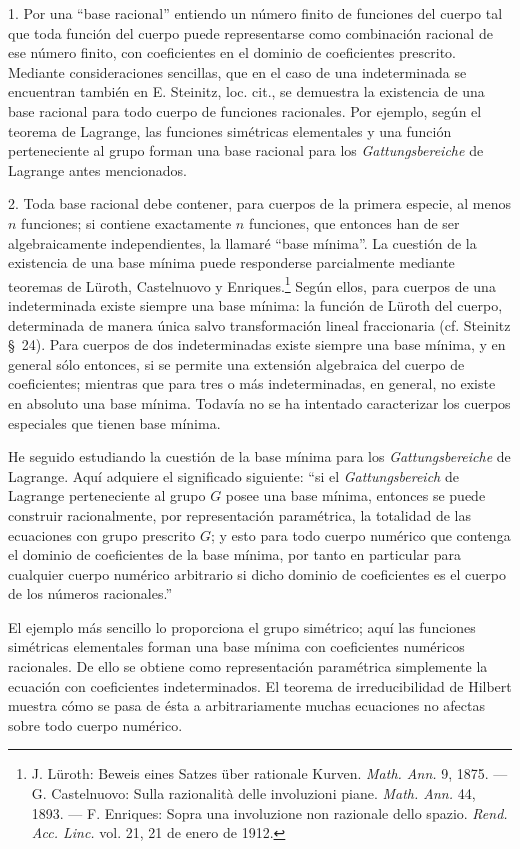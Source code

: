 \documentclass[11pt]{article}
\begin{document}
1. Por una ``base racional'' entiendo un número finito de funciones del cuerpo tal que toda función del cuerpo puede representarse como combinación racional de ese número finito, con coeficientes en el dominio de coeficientes prescrito. Mediante consideraciones sencillas, que en el caso de una indeterminada se encuentran también en E. Steinitz, loc. cit., se demuestra la existencia de una base racional para todo cuerpo de funciones racionales. Por ejemplo, según el teorema de Lagrange, las funciones simétricas elementales y una función perteneciente al grupo forman una base racional para los \emph{Gattungsbereiche} de Lagrange antes mencionados.

2. Toda base racional debe contener, para cuerpos de la primera especie, al menos $n$ funciones; si contiene exactamente $n$ funciones, que entonces han de ser algebraicamente independientes, la llamaré ``base mínima''. La cuestión de la existencia de una base mínima puede responderse parcialmente mediante teoremas de Lüroth, Castelnuovo y Enriques.\footnote{J. Lüroth: Beweis eines Satzes über rationale Kurven. \emph{Math. Ann.} 9, 1875. --- G. Castelnuovo: Sulla razionalità delle involuzioni piane. \emph{Math. Ann.} 44, 1893. --- F. Enriques: Sopra una involuzione non razionale dello spazio. \emph{Rend. Acc. Linc.} vol. 21, 21 de enero de 1912.} Según ellos, para cuerpos de una indeterminada existe siempre una base mínima: la función de Lüroth del cuerpo, determinada de manera única salvo transformación lineal fraccionaria (cf. Steinitz \S\ 24). Para cuerpos de dos indeterminadas existe siempre una base mínima, y en general sólo entonces, si se permite una extensión algebraica del cuerpo de coeficientes; mientras que para tres o más indeterminadas, en general, no existe en absoluto una base mínima. Todavía no se ha intentado caracterizar los cuerpos especiales que tienen base mínima.

He seguido estudiando la cuestión de la base mínima para los \emph{Gattungsbereiche} de Lagrange. Aquí adquiere el significado siguiente: ``si el \emph{Gattungsbereich} de Lagrange perteneciente al grupo $G$ posee una base mínima, entonces se puede construir racionalmente, por representación paramétrica, la totalidad de las ecuaciones con grupo prescrito $G$; y esto para todo cuerpo numérico que contenga el dominio de coeficientes de la base mínima, por tanto en particular para cualquier cuerpo numérico arbitrario si dicho dominio de coeficientes es el cuerpo de los números racionales.''

El ejemplo más sencillo lo proporciona el grupo simétrico; aquí las funciones simétricas elementales forman una base mínima con coeficientes numéricos racionales. De ello se obtiene como representación paramétrica simplemente la ecuación con coeficientes indeterminados. El teorema de irreducibilidad de Hilbert muestra cómo se pasa de ésta a arbitrariamente muchas ecuaciones no afectas sobre todo cuerpo numérico.
\end{document}
